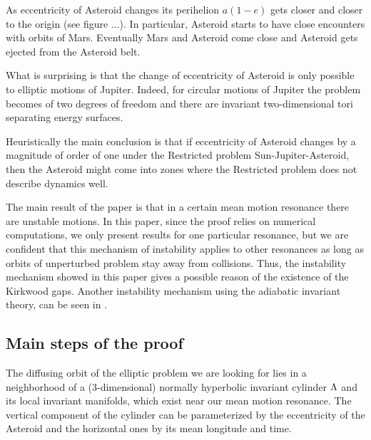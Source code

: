 As eccentricity of Asteroid changes its perihelion $a(1-e)$ gets closer 
and closer to the origin (see figure ...). In particular, Asteroid starts 
to have close encounters with orbits of Mars. Eventually Mars and 
Asteroid come close and Asteroid gets ejected from the Asteroid belt.  

What is surprising is that the change of eccentricity of Asteroid is only
possible to elliptic motions of Jupiter. Indeed, for circular motions of 
Jupiter the problem becomes of two degrees of freedom and there are 
invariant two-dimensional tori separating energy surfaces. 

Heuristically the main conclusion is that if eccentricity of Asteroid
changes by a magnitude of order of one under the Restricted problem
Sun-Jupiter-Asteroid, then the Asteroid might come into zones where 
the Restricted problem does not describe dynamics well. 

The main result of the paper is that in a certain mean motion  
resonance there are unstable motions. In this paper, since the proof relies on numerical computations, we only present results for one particular resonance, but we are confident that this mechanism of instability applies to other 
resonances as long as orbits of unperturbed problem stay away from
collisions. Thus, the instability mechanism showed in this paper gives a possible reason of the existence of the Kirkwood gaps. Another instability mechanism using the adiabatic invariant theory, can be seen in \cite{NeishtadtS04}.





\subsection{Main steps of the proof}

The diffusing orbit of the elliptic problem we are looking for lies
in a neighborhood of a ($3$-dimensional) normally hyperbolic invariant
cylinder $\Lambda$ and its local invariant manifolds, which exist near
our mean motion resonance. The vertical component of the cylinder can be
parameterized by the eccentricity of the Asteroid and the horizontal
ones by its mean longitude and time.

